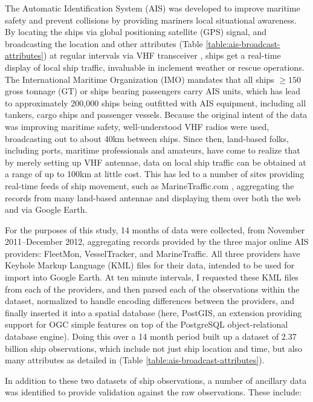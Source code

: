 The Automatic Identification System (AIS) \citep{Tetreault2002} was developed to improve maritime safety and prevent collisions by providing mariners local situational awareness. By locating the ships via global positioning satellite (GPS) signal, and broadcasting the location and other attributes (Table \ref{table:ais-broadcast-attributes}) at regular intervals via VHF transceiver \citep{Itu-r2010}, ships get a real-time display of local ship traffic, invaluable in inclement weather or rescue operations.  The International Maritime Organization (IMO) mandates that all ships $\geq150$ gross tonnage (GT) or ships bearing passengers carry AIS units, which has lead to approximately 200,000 ships being outfitted with AIS equipment, including all tankers, cargo ships and passenger vessels. Because the original intent of the data was improving maritime safety, well-understood VHF radios were used, broadcasting out to about 40km between ships. Since then, land-based folks, including ports, maritime professionals and amateurs, have come to realize that by merely setting up VHF antennae, data on local ship traffic can be obtained at a range of up to 100km at little cost. This has led to a number of sites providing real-time feeds of ship movement, such as MarineTraffic.com \citep{MarineTraffic}, aggregating the records from many land-based antennae and displaying them over both the web and via Google Earth. 

For the purposes of this study, 14 months of data were collected, from November 2011--December 2012, aggregating records provided by the three major online AIS providers: FleetMon, VesselTracker, and MarineTraffic. All three providers have Keyhole Markup Language (KML) files for their data, intended to be used for import into Google Earth. At ten minute intervals, I requested these KML files from each of the providers, and then parsed each of the observations within the dataset, normalized to handle encoding differences between the providers, and finally inserted it into a spatial database (here, PostGIS, an extension providing support for OGC simple features on top of the PostgreSQL object-relational database engine). Doing this over a 14 month period built up a dataset of 2.37 billion ship observations, which include not just ship location and time, but also many attributes as detailed in (Table \ref{table:ais-broadcast-attributes}).

In addition to these two datasets of ship observations, a number of ancillary data was identified to provide validation against the raw observations. These include: 


